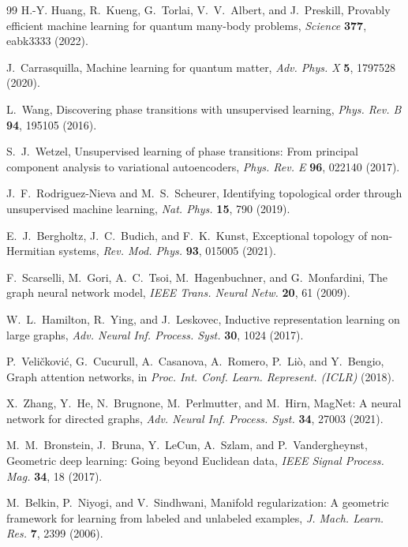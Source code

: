 \documentclass[aps,prresearch,reprint,amsmath,amssymb,nofootinbib,superscriptaddress,floatfix]{revtex4-2}
\theoremstyle{definition}
\theoremstyle{remark}
\theoremstyle{plain}
\begin{document}
\begin{thebibliography}{99}
H.-Y. Huang, R.~Kueng, G.~Torlai, V.~V.~Albert, and J.~Preskill,
Provably efficient machine learning for quantum many-body problems,
\emph{Science} \textbf{377}, eabk3333 (2022).

J.~Carrasquilla,
Machine learning for quantum matter,
\emph{Adv. Phys. X} \textbf{5}, 1797528 (2020).

L.~Wang,
Discovering phase transitions with unsupervised learning,
\emph{Phys. Rev. B} \textbf{94}, 195105 (2016).

S.~J.~Wetzel,
Unsupervised learning of phase transitions: From principal component analysis to variational autoencoders,
\emph{Phys. Rev. E} \textbf{96}, 022140 (2017).

J.~F.~Rodriguez-Nieva and M.~S.~Scheurer,
Identifying topological order through unsupervised machine learning,
\emph{Nat. Phys.} \textbf{15}, 790 (2019).

E.~J.~Bergholtz, J.~C.~Budich, and F.~K.~Kunst,
Exceptional topology of non-Hermitian systems,
\emph{Rev. Mod. Phys.} \textbf{93}, 015005 (2021).

F.~Scarselli, M.~Gori, A.~C.~Tsoi, M.~Hagenbuchner, and G.~Monfardini,
The graph neural network model,
\emph{IEEE Trans. Neural Netw.} \textbf{20}, 61 (2009).

W.~L.~Hamilton, R.~Ying, and J.~Leskovec,
Inductive representation learning on large graphs,
\emph{Adv. Neural Inf. Process. Syst.} \textbf{30}, 1024 (2017).

P.~Veli\v{c}kovi\'c, G.~Cucurull, A.~Casanova, A.~Romero, P.~Li\`o, and Y.~Bengio,
Graph attention networks,
in \emph{Proc. Int. Conf. Learn. Represent. (ICLR)} (2018).

X.~Zhang, Y.~He, N.~Brugnone, M.~Perlmutter, and M.~Hirn,
MagNet: A neural network for directed graphs,
\emph{Adv. Neural Inf. Process. Syst.} \textbf{34}, 27003 (2021).

M.~M.~Bronstein, J.~Bruna, Y.~LeCun, A.~Szlam, and P.~Vandergheynst,
Geometric deep learning: Going beyond Euclidean data,
\emph{IEEE Signal Process. Mag.} \textbf{34}, 18 (2017).

M.~Belkin, P.~Niyogi, and V.~Sindhwani,
Manifold regularization: A geometric framework for learning from labeled and unlabeled examples,
\emph{J. Mach. Learn. Res.} \textbf{7}, 2399 (2006).


\end{thebibliography}
\end{document}
